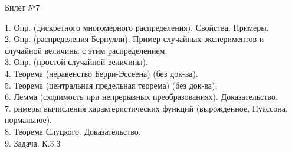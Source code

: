 \documentclass[preview]{standalone}
\begin{document}
 
\begin{center} {\Large Билет №7} \end{center} 

1.  Опр. (дискретного многомерного распределения). Свойства. Примеры.\\

2.  Опр. (распределения Бернулли).  Пример случайных экспериментов и случайной величины с этим распределением.\\

3.  Опр. (простой случайной величины).\\

4.  Теорема (неравенство Берри-Эссеена) (без док-ва).\\

5.  Теорема (центральная предельная теорема) (без док-ва).\\

6.  Лемма  (сходимость при непрерывных преобразованиях). Доказательство.\\

7. римеры вычисления характеристических функций (вырожденное, Пуассона, нормальное).\\

8.  Теорема Слуцкого. Доказательство.\\

9. Задача. К.3.3\\
\end{document}
